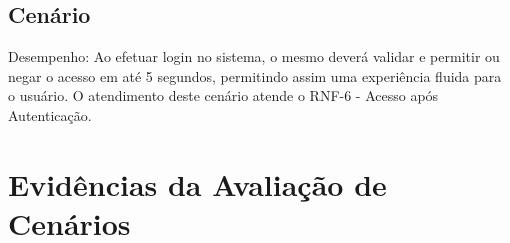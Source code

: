 \pgfmathtruncatemacro{}
\subsection{Cenário \cen} 
Desempenho: Ao efetuar login no sistema, o mesmo deverá validar e permitir ou negar o acesso em até 5 segundos, permitindo assim uma
experiência fluida para o usuário. O atendimento deste cenário atende o RNF-6 - Acesso após Autenticação.

\pgfmathsetmacro{}
\section{Evidências da Avaliação de Cenários}
\vspace{0.5cm}


\pgfmathtruncatemacro{}
